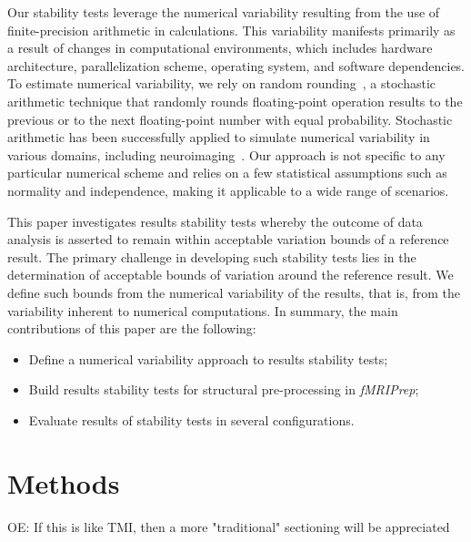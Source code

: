 \documentclass[lettersize,journal]{IEEEtran}
\newcommand{\oesteban}[1]{\color{orange}\textsc{OE:} #1\color{black}\xspace}
\newcommand{\fmriprep}{\emph{fMRIPrep}\xspace}
\begin{document}

Our stability tests leverage the numerical variability resulting from the use of finite-precision arithmetic in calculations. This variability manifests primarily as a result of changes in computational environments, which includes hardware architecture, parallelization scheme, operating system, and software dependencies. To estimate numerical variability, we rely on random rounding~\cite{forsythe1959reprint}, a stochastic arithmetic technique that randomly rounds floating-point operation results to the previous or to the next floating-point number with equal probability. Stochastic arithmetic has been successfully applied to simulate numerical variability in various domains, including neuroimaging~\cite{salari2021accurate, kiar2021numerical}. Our approach is not specific to any particular numerical scheme and relies on a few statistical assumptions such as normality and independence, making it applicable to a wide range of scenarios.

This paper investigates results stability tests whereby the outcome of data analysis is asserted to remain within acceptable variation bounds of a reference result. The primary challenge in developing such stability tests lies in the determination of acceptable bounds of variation around the reference result. We define such bounds from the numerical variability of the results, that is, from the variability inherent to numerical computations.
In summary, the main contributions of this paper are the following:
\begin{itemize}
    \item Define a numerical variability approach to results stability tests;
    \item Build results stability tests for structural pre-processing in \fmriprep;
    \item Evaluate results of stability tests in several configurations.
\end{itemize}

\section{Methods}
\oesteban{If this is like TMI, then a more "traditional" sectioning will be appreciated}
\end{document}
